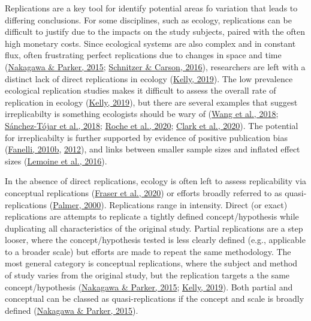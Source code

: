 \documentclass[10pt,a4paper]{article}
\begin{document}
Replications are a key tool for identify potential areas fo variation that leads to differing conclusions.
For some disciplines, such as ecology, replications can be difficult to justify due to the impacts on the study subjects, paired with the often high monetary costs.
Since ecological systems are also complex and in constant flux, often frustrating perfect replications due to changes in space and time (\protect\hyperlink{ref-nakagawa_replicating_2015}{Nakagawa \& Parker, 2015}; \protect\hyperlink{ref-schnitzer_would_2016}{Schnitzer \& Carson, 2016}), researchers are left with a distinct lack of direct replications in ecology (\protect\hyperlink{ref-kelly_rate_2019}{Kelly, 2019}).
The low prevalence ecological replication studies makes it difficult to assess the overall rate of replication in ecology (\protect\hyperlink{ref-kelly_rate_2019}{Kelly, 2019}), but there are several examples that suggest irreplicabilty is something ecologists should be wary of (\protect\hyperlink{ref-wang_irreproducible_2018}{Wang et al., 2018}; \protect\hyperlink{ref-sanchez-tojar_meta-analysis_2018}{Sánchez-Tójar et al., 2018}; \protect\hyperlink{ref-roche_behavioural_2020}{Roche et al., 2020}; \protect\hyperlink{ref-clark_ocean_2020}{Clark et al., 2020}).
The potential for irreplicabilty is further supported by evidence of positive publication bias (\protect\hyperlink{ref-fanelli_positive_2010}{Fanelli, 2010b}, \protect\hyperlink{ref-fanelli_negative_2012}{2012}), and links between smaller sample sizes and inflated effect sizes (\protect\hyperlink{ref-lemoine_underappreciated_2016}{Lemoine et al., 2016}).

In the absence of direct replications, ecology is often left to assess replicability via conceptual replications (\protect\hyperlink{ref-fraser_role_2020}{Fraser et al., 2020}) or efforts broadly referred to as quasi-replications (\protect\hyperlink{ref-palmer_quasi-replication_2000}{Palmer, 2000}).
Replications range in intensity.
Direct (or exact) replications are attempts to replicate a tightly defined concept/hypothesis while duplicating all characteristics of the original study.
Partial replications are a step looser, where the concept/hypothesis tested is less clearly defined (e.g., applicable to a broader scale) but efforts are made to repeat the same methodology.
The most general category is conceptual replications, where the subject and method of study varies from the original study, but the replication targets a the same concept/hypothesis (\protect\hyperlink{ref-nakagawa_replicating_2015}{Nakagawa \& Parker, 2015}; \protect\hyperlink{ref-kelly_rate_2019}{Kelly, 2019}).
Both partial and conceptual can be classed as quasi-replications if the concept and scale is broadly defined (\protect\hyperlink{ref-nakagawa_replicating_2015}{Nakagawa \& Parker, 2015}).
\end{document}
